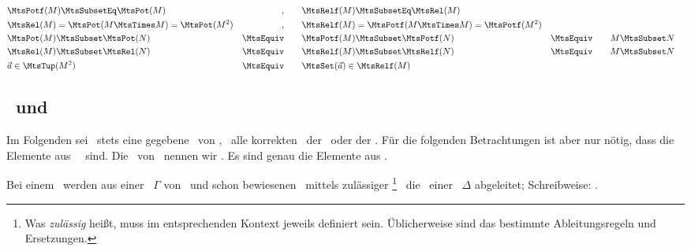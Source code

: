 \begin{align}
	& \MtsPotf(M) \MtsSubsetEq \MtsPot          (M)
	& ,          \qquad
	& \MtsRelf(M) \MtsSubsetEq \MtsRel          (M)
	\label{eq:Setf} \\
	& \MtsRel (M) =            \MtsPot (M \MtsTimes M)=\MtsPot (M^2)
	& ,          \qquad
	& \MtsRelf(M) =            \MtsPotf(M \MtsTimes M)=\MtsPotf(M^2)
	\label{eq:relPot} \\
	& \MtsPot (M) \MtsSubset   \MtsPot          (N)
	& \MtsEquiv \qquad
	& \MtsPotf(M) \MtsSubset   \MtsPotf         (N)
	& \MtsEquiv \qquad
	&               M  \MtsSubset                          N
	\label{eq:potPot} \\
	& \MtsRel (M) \MtsSubset   \MtsRel          (N)
	& \MtsEquiv \qquad
	& \MtsRelf(M) \MtsSubset   \MtsRelf         (N)
	& \MtsEquiv \qquad
	&               M  \MtsSubset                          N
	\label{eq:relRel} \\
	&                                 \vec{a}  \in \MtsTup(M^2)
	& \MtsEquiv \qquad  & \MtsSet(\vec{a}) \in \MtsRelf    (M)
	\label{eq:vecrel}
\end{align}

\subsection[Formeln und Ableitungen]{\Formeln\ und \Ableitungen}%
\label             {sub:Ableitungen}

Im Folgenden sei \MtsSprache\ stets eine gegebene \Menge\ von \Formeln, \textzB\ alle korrekten \Formeln\ der \Aussagenlogik\ oder der \Praedikatenlogik.
Für die folgenden Betrachtungen ist aber nur nötig, dass die Elemente aus \MtsSprache\ \Symbolfolgen\ sind.
Die \Teilmengen\ von \MtsSprache\ nennen wir .
Es sind genau die Elemente aus \MtsPotSprache.

Bei einem \Beweis\ werden aus einer \Formelmenge\ $\Gamma$ von \Axiomen\ und schon bewiesenen \Formeln\ mittels zulässiger
\footnote{%
	Was \emph{zulässig} heißt, muss im entsprechenden Kontext jeweils definiert sein.
	Üblicherweise sind das bestimmte Ableitungsregeln und Ersetzungen.
}
\Ableitungen\ die \Formeln\ einer \Formelmenge\ $\Delta$ abgeleitet; Schreibweise: \seqqt{$\Gamma \MtsDerive \Delta$}.

